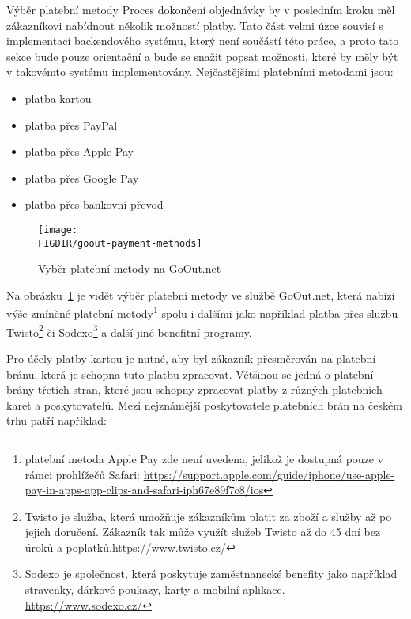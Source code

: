 \begin{subsection}{Výběr platební metody}
    \label{subsec:identifikace-dokonceni-objednavky-vyber-platebni-metody}
    Proces dokončení objednávky by v posledním kroku měl zákazníkovi nabídnout několik možností platby.
    Tato část velmi úzce souvisí s implementací backendového systému, který není součástí této práce, a proto tato sekce bude pouze orientační a bude se snažit popsat možnosti, které by měly být v takovémto systému implementovány.
    Nejčastějšími platebními metodami jsou:

    \begin{itemize}
        \item platba kartou
        \item platba přes PayPal
        \item platba přes Apple Pay
        \item platba přes Google Pay
        \item platba přes bankovní převod
    \end{itemize}

    \begin{figure}[H]
        \texttt{[image: \\FIGDIR/goout-payment-methods]}
        \centering
        \caption{Vyběr platební metody na GoOut.net\cite{g__goout_net}}
        \label{fig:goout-payment-methods}
    \end{figure}

    Na obrázku~\ref{fig:goout-payment-methods} je vidět výběr platební metody ve službě GoOut.net, která nabízí výše zmíněné platební metody\footnote{platební metoda Apple Pay zde není uvedena, jelikož je dostupná pouze v rámci prohlížečů Safari: \url{https://support.apple.com/guide/iphone/use-apple-pay-in-apps-app-clips-and-safari-iph67e89f7c8/ios}} spolu i dalšími jako například platba přes službu Twisto\footnote{Twisto je služba, která umožňuje zákazníkům platit za zboží a služby až po jejich doručení. Zákazník tak může využít služeb Twisto až do 45 dní bez úroků a poplatků.\url{https://www.twisto.cz/}} či Sodexo\footnote{Sodexo je společnost, která poskytuje zaměstnanecké benefity jako například stravenky, dárkové poukazy, karty a mobilní aplikace. \url{https://www.sodexo.cz/}} a další jiné benefitní programy.

    Pro účely platby kartou je nutné, aby byl zákazník přesměrován na platební bránu, která je schopna tuto platbu zpracovat.
    Většinou se jedná o platební brány třetích stran, které jsou schopny zpracovat platby z různých platebních karet a poskytovatelů.
    Mezi nejznámější poskytovatele platebních brán na českém trhu patří například:


\end{subsection}
